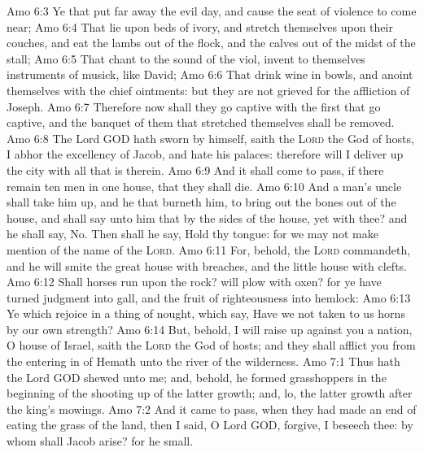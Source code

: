 \vs Amo 6:3 Ye that put far away the evil day, and cause the seat of violence to come near;
\vs Amo 6:4 That lie upon beds of ivory, and stretch themselves upon their couches, and eat the lambs out of the flock, and the calves out of the midst of the stall;
\vs Amo 6:5 That chant to the sound of the viol,  invent to themselves instruments of musick, like David;
\vs Amo 6:6 That drink wine in bowls, and anoint themselves with the chief ointments: but they are not grieved for the affliction of Joseph.
\vs Amo 6:7 Therefore now shall they go captive with the first that go captive, and the banquet of them that stretched themselves shall be removed.
\vs Amo 6:8 The Lord GOD hath sworn by himself, saith the \textsc{Lord} the God of hosts, I abhor the excellency of Jacob, and hate his palaces: therefore will I deliver up the city with all that is therein.
\vs Amo 6:9 And it shall come to pass, if there remain ten men in one house, that they shall die.
\vs Amo 6:10 And a man's uncle shall take him up, and he that burneth him, to bring out the bones out of the house, and shall say unto him that  by the sides of the house,  yet  with thee? and he shall say, No. Then shall he say, Hold thy tongue: for we may not make mention of the name of the \textsc{Lord}.
\vs Amo 6:11 For, behold, the \textsc{Lord} commandeth, and he will smite the great house with breaches, and the little house with clefts.
\vs Amo 6:12 Shall horses run upon the rock? will  plow  with oxen? for ye have turned judgment into gall, and the fruit of righteousness into hemlock:
\vs Amo 6:13 Ye which rejoice in a thing of nought, which say, Have we not taken to us horns by our own strength?
\vs Amo 6:14 But, behold, I will raise up against you a nation, O house of Israel, saith the \textsc{Lord} the God of hosts; and they shall afflict you from the entering in of Hemath unto the river of the wilderness.
\vs Amo 7:1 Thus hath the Lord GOD shewed unto me; and, behold, he formed grasshoppers in the beginning of the shooting up of the latter growth; and, lo,  the latter growth after the king's mowings.
\vs Amo 7:2 And it came to pass,  when they had made an end of eating the grass of the land, then I said, O Lord GOD, forgive, I beseech thee: by whom shall Jacob arise? for he  small.
